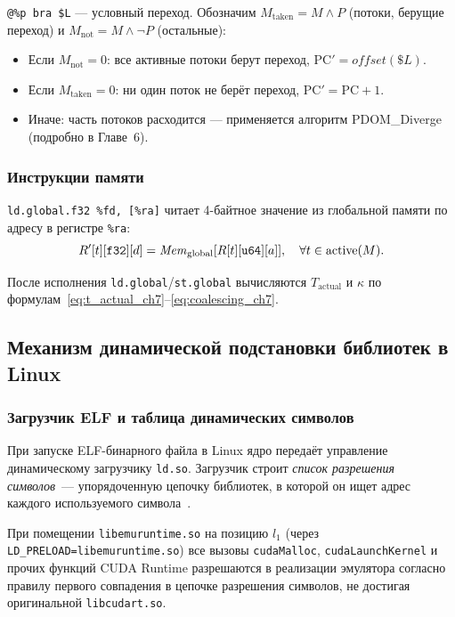 \texttt{@\%p bra \$L} — условный переход. Обозначим $M_{\mathrm{taken}} = M \wedge P$
(потоки, берущие переход) и $M_{\mathrm{not}} = M \wedge \neg P$ (остальные):

\begin{itemize}
  \item Если $M_{\mathrm{not}} = 0$: все активные потоки берут переход,
        $\mathrm{PC}' = \mathit{offset}(\$L)$.
  \item Если $M_{\mathrm{taken}} = 0$: ни один поток не берёт переход,
        $\mathrm{PC}' = \mathrm{PC} + 1$.
  \item Иначе: часть потоков расходится — применяется алгоритм
        PDOM\_Diverge (подробно в Главе~6).
\end{itemize}

\subsubsection{Инструкции памяти}

\texttt{ld.global.f32 \%fd, [\%ra]} читает 4-байтное значение
из глобальной памяти по адресу в регистре \texttt{\%ra}:
\begin{equation}
  R'[t][\mathtt{f32}][d] = \mathit{Mem}_{\mathrm{global}}[R[t][\mathtt{u64}][a]],
  \quad \forall t \in \mathrm{active}(M).
\end{equation}

После исполнения \texttt{ld.global}/\texttt{st.global} вычисляются
$T_{\mathrm{actual}}$ и $\kappa$ по формулам~\eqref{eq:t_actual_ch7}--\eqref{eq:coalescing_ch7}.

\subsection{Механизм динамической подстановки библиотек в Linux}

\subsubsection{Загрузчик ELF и таблица динамических символов}

При запуске ELF-бинарного файла в Linux ядро передаёт управление
динамическому загрузчику \texttt{ld.so}. Загрузчик строит
\textit{список разрешения символов}~--- упорядоченную цепочку библиотек,
в которой он ищет адрес каждого используемого символа~\cite{LinuxManLdso, Stolyarov2011}.

При помещении \texttt{libemuruntime.so} на позицию $l_1$
(через \texttt{LD\_PRELOAD=libemuruntime.so}) все вызовы
\texttt{cudaMalloc}, \texttt{cudaLaunchKernel} и прочих
функций CUDA Runtime разрешаются в реализации эмулятора
согласно правилу первого совпадения в цепочке разрешения символов, не достигая оригинальной
\texttt{libcudart.so}.



